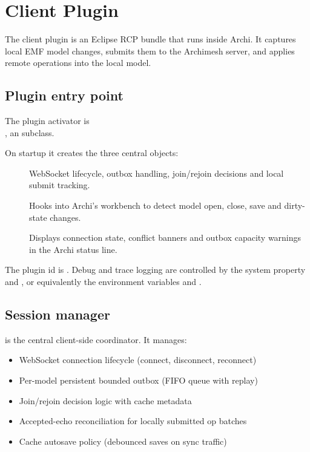 \section{Client Plugin}
\label{sec:ClientPlugin}

The client plugin is an Eclipse RCP bundle that runs inside Archi. It captures
local EMF model changes, submits them to the Archimesh server, and applies
remote operations into the local model.

\subsection{Plugin entry point}

The plugin activator is \\ ,
an  subclass.

On startup it creates the three central objects:

\begin{description}
\item[] WebSocket lifecycle, outbox handling,
  join/rejoin decisions and local submit tracking.
\item[] Hooks into Archi's workbench to
  detect model open, close, save and dirty-state changes.
\item[] Displays connection state, conflict
  banners and outbox capacity warnings in the Archi status line.
\end{description}

The plugin id is . Debug and trace
logging are controlled by the system property  and
, or equivalently the environment variables
 and .

\subsection{Session manager}

 is the central client-side coordinator. It
manages:

\begin{itemize}
\item WebSocket connection lifecycle (connect, disconnect, reconnect)
\item Per-model persistent bounded outbox (FIFO queue with replay)
\item Join/rejoin decision logic with cache metadata
\item Accepted-echo reconciliation for locally submitted op batches
\item Cache autosave policy (debounced saves on sync traffic)
\end{itemize}

